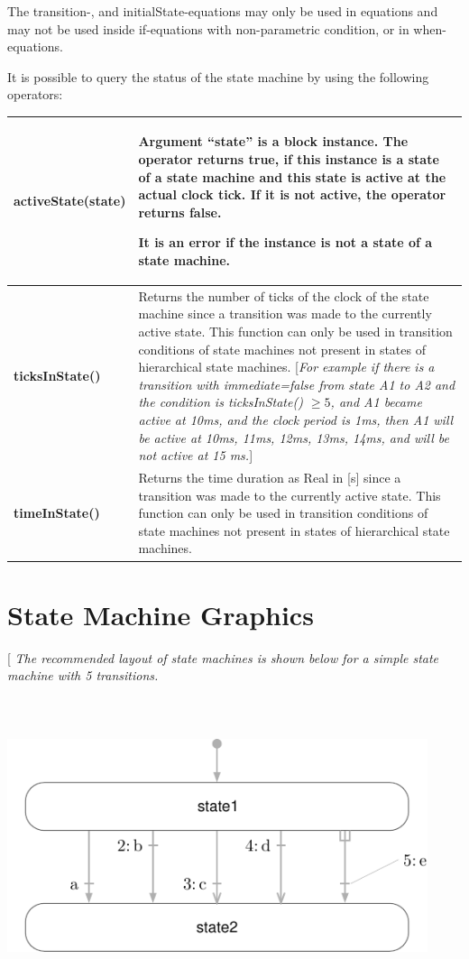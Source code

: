 \documentclass[10pt,a4paper]{report}
\def\doublelabel#1{\label{#1}}
\begin{document}
The transition-, and initialState-equations may only be used in
equations and may not be used inside if-equations with non-parametric
condition, or in when-equations.

It is possible to query the status of the state machine by using the
following operators:

\begin{longtable}[]{|p{4cm}|p{10cm}|}
\hline \endhead
\textbf{activeState}(state)&
Argument ``state'' is a block instance. The operator returns
\textbf{true}, if this instance is a state of a state machine and this
state is active at the actual clock tick. If it is not active, the
operator returns \textbf{false}.

It is an error if the instance is not a state of a state machine.\\ \hline
\textbf{ticksInState()} & Returns the number of ticks of the clock of
the state machine since a transition was made to the currently active
state. This function can only be used in transition conditions of state
machines not present in states of hierarchical state machines.
{[}\emph{For example if there is a transition with immediate=false from
state A1 to A2 and the condition is ticksInState() $\ge 5$, and A1 became
active at 10ms, and the clock period is 1ms, then A1 will be active at
10ms, 11ms, 12ms, 13ms, 14ms, and will be not active at 15 ms.}{]}\\ \hline
\textbf{timeInState()} & Returns the time duration as Real in {[}s{]}
since a transition was made to the currently active state. This function
can only be used in transition conditions of state machines not present
in states of hierarchical state machines.\\ \hline

\end{longtable}

\section{State Machine Graphics}\doublelabel{state-machine-graphics}

{[} \emph{The recommended layout of state machines is shown below for a
simple state machine with 5 transitions. }

\includegraphics[width=4.85417in,height=3.42708in]{media/statemachine}
\end{document}
